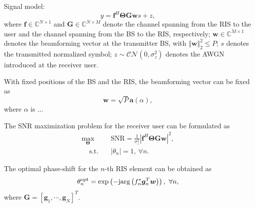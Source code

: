 \documentclass[12pt,draftclsnofoot,journal,onecolumn]{IEEEtran}
\theoremstyle{nonumberplain}
\def \opt {^{\text{opt}}}
\def \opt {^{\text{opt}}}
\def \exp {\text{exp}}
\def \arg {\text{arg}}
\begin{document}
Signal model:
\begin{equation}
\label{Signal model}
y=\bm f^{H}\bm \Theta\bm G\bm ws+z,
\end{equation}
where $\bm f\in \mathbb C ^{N\times 1}$ and $\bm G \in \mathbb C^{N\times M}$ denote the channel spanning from the RIS to the user and the channel spanning from the BS to the RIS, respectively; $\bm w\in \mathbb C^{M\times 1}$ denotes the beamforming vector at the transmitter BS, with $\left\Vert \bm w\right \Vert_{2}^{2}\leq P$; $s$ denotes the transmitted normalized symbol; $z\sim \mathcal{CN}\left(0,\sigma_{z}^{2}\right)$ denotes the \ac{AWGN} introduced at the receiver user.

With fixed positions of the BS and the RIS, the beamforming vector can be fixed as
\begin{equation}
\label{fixed w}
\bm w=\sqrt{P}\bm a\left(\alpha\right),
\end{equation}
where $\alpha$ is ...

The SNR maximization problem for the receiver user can be formulated as
\begin{subequations}
\label{optimization}
\begin{align}
\label{objective}
\max_{\bm \Theta}~~&\text{SNR}=\frac{1}{\sigma_{z}^{2}}
\left\vert
\bm f^{H}\bm \Theta\bm G\bm w \right\vert^{2},\\
\label{constraint}
~~~~~\text{s.t.~~~}&\left\vert\theta_{n}\right\vert=1,~\forall n.
\end{align}
\end{subequations}

The optimal phase-shift for the $n$-th RIS element can be obtained as
\begin{equation}
\label{optimal RIS}
\theta_{n}\opt = \exp\left(-{\rm j} \arg\left(f_{n}^{*}\bm g_{n}^{T}\bm w\right)\right),~\forall n,
\end{equation}
where $\bm G = \left[\bm g_{1}, \cdots, \bm g_{N}\right]^{T}$.
\end{document}
